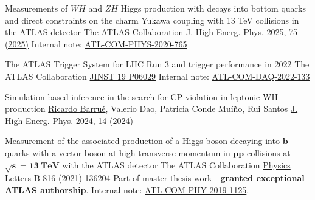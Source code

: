 


\begin{cventries}

    \cventry
    {Measurements of $WH$ and $ZH$ Higgs production with decays into bottom quarks and direct constraints on the charm Yukawa coupling with 13 TeV collisions in the ATLAS detector}
    {The ATLAS Collaboration}{}
    {\href{https://doi.org/10.1007/JHEP04(2025)075}{J. High Energ. Phys. 2025, 75 (2025)}}
    {
        Internal note: \href{https://cds.cern.ch/record/2743096}{ATL-COM-PHYS-2020-765}
    }

    \cventry
    {The ATLAS Trigger System for LHC Run 3 and trigger performance in 2022}
    {The ATLAS Collaboration}
    {}
    {\href{https://doi.org/10.1088/1748-0221/19/06/P06029}{JINST 19 P06029}}
    {
        Internal note: \href{https://cds.cern.ch/record/2845056}{ATL-COM-DAQ-2022-133}
    }

    \cventry
    {Simulation-based inference in the search for CP violation in leptonic WH production}
    {\underline{Ricardo Barrué}, Valerio Dao, Patricia Conde Muíño, Rui Santos}
    {}
    {\href{https://doi.org/10.1007/JHEP04(2024)014}{J. High Energ. Phys. 2024, 14 (2024)}}
    {
    }%

    \cventry
    {Measurement of the associated production of a Higgs boson decaying into $\mathbf{b}$-quarks with a vector boson at high transverse momentum in $\mathbf{pp}$ collisions at $\mathbf{\sqrt{s}= 13 \:\text{TeV}}$ with the ATLAS detector}
    {The ATLAS Collaboration}
    {}
    {\href{https://doi.org/10.1016/j.physletb.2021.136204}{Physics Letters B 816 (2021) 136204}}
    {
        Part of master thesis work - \textbf{granted exceptional ATLAS authorship}. Internal note: \href{https://cds.cern.ch/record/2688371}{ATL-COM-PHY-2019-1125}.
    }
    

\end{cventries}

